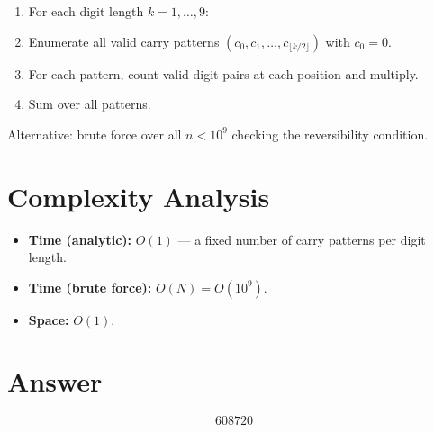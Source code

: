 \documentclass[12pt]{article}
\begin{document}
\begin{enumerate}
\item For each digit length $k = 1, \ldots, 9$:
\item Enumerate all valid carry patterns $(c_0, c_1, \ldots, c_{\lfloor k/2 \rfloor})$ with $c_0 = 0$.
\item For each pattern, count valid digit pairs at each position and multiply.
\item Sum over all patterns.
\end{enumerate}

Alternative: brute force over all $n < 10^9$ checking the reversibility condition.

\section{Complexity Analysis}

\begin{itemize}
\item \textbf{Time (analytic):} $O(1)$ --- a fixed number of carry patterns per digit length.
\item \textbf{Time (brute force):} $O(N) = O(10^9)$.
\item \textbf{Space:} $O(1)$.
\end{itemize}

\section{Answer}

\[
\boxed{608720}
\]
\end{document}

